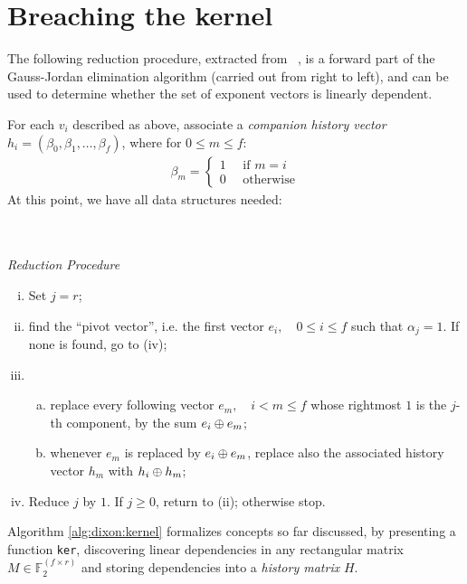 \section{Breaching the kernel}

The following reduction procedure, extracted from ~\cite{morrison-brillhart}, is
a forward part of the Gauss-Jordan elimination algorithm (carried out from right
to left), and can be used to determine whether the set of exponent vectors is
linearly dependent.

For each $v_i$ described as above, associate a \emph{companion history vector}
$h_i = (\beta_0, \beta_1, \ldots, \beta_f)$, where for $0 \leq m \leq f$:
\begin{align*}
  \beta_m = \begin{cases}
    1 \quad \text{ if $m = i$} \\
    0 \quad \text{ otherwise}
    \end{cases}
\end{align*}
At this point, we have all data structures needed:
\\
\\
\\

\begin{center}
  \emph{Reduction Procedure}
\end{center}
\begin{enumerate}[(i)]
  \item Set $j=r$;
  \item find the ``pivot vector'', i.e. the first vector
    $e_i, \quad 0 \leq i \leq f$ such that $\alpha_j = 1$. If none is found, go
    to (iv);
  \item
    \begin{enumerate}[(a)]
      \item replace every following vector $e_m, \quad i < m \leq f$
        whose rightmost $1$ is the $j$-th component, by the sum $e_i \oplus e_m$;
      \item whenever $e_m$ is replaced by $e_i \oplus e_m$, replace also the
        associated history vector $h_m$ with $h_i \oplus h_m$;
    \end{enumerate}
  \item Reduce $j$ by $1$. If $j \geq 0$, return to (ii); otherwise stop.
\end{enumerate}

Algorithm \ref{alg:dixon:kernel} formalizes concepts so far discussed, by
presenting a function \texttt{ker}, discovering linear dependencies in any
rectangular matrix $M \in \mathbb{F}_2^{(f \times r)}$
and storing dependencies into a \emph{history matrix} $H$.

